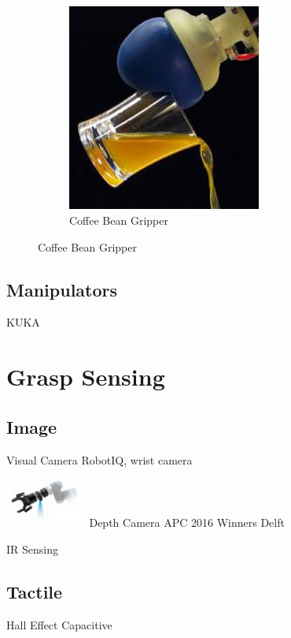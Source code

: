 \begin{figure}
\begin{subfigure}{.3\linewidth}
        \label{fig:DLR Hand II}
    \end{subfigure}
    \begin{subfigure}{.3\linewidth}
        \centering
        \includegraphics[width=0.7\textwidth]{Images/CoffeeBeanGripper.jpeg}    \caption{Coffee Bean Gripper}
        \label{fig:Coffee Bean Gripper}
    \end{subfigure}
\end{figure}

\subsection{Manipulators}
KUKA

\section{Grasp Sensing}

\subsection{Image}
Visual Camera
    RobotIQ, wrist camera
    
    
    \includegraphics[width=0.2\textwidth]{Images/robotiq-vision-guided-robotic-hand-system.png}
Depth Camera
    APC 2016 Winners Delft

IR Sensing

\subsection{Tactile}
Hall Effect
Capacitive

